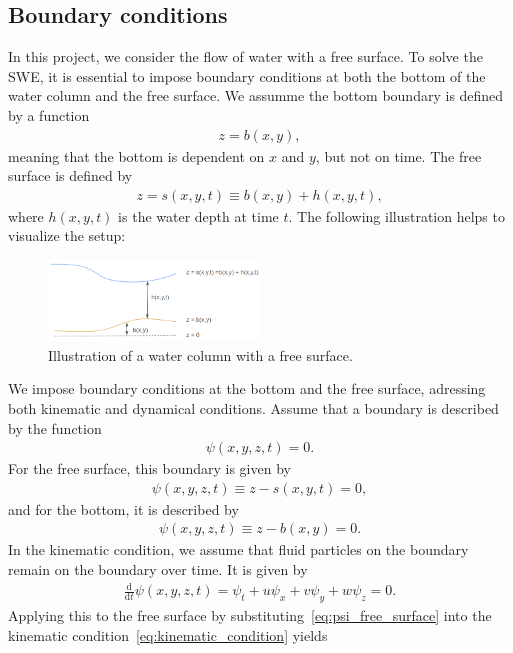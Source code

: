 \subsection{Boundary conditions}
In this project, we consider the flow of water with a free surface.
To solve the SWE, it is essential to impose boundary conditions at both the bottom of the water column and the free surface.
We assumme the bottom boundary is defined by a function
\begin{align*}
    z = b(x,y),
\end{align*}
meaning that the bottom is dependent on $x$ and $y$, but not on time.
The free surface is defined by 
\begin{align*}
    z = s(x,y,t) \equiv b(x,y) + h(x,y,t),
\end{align*}
where $h(x,y,t)$ is the water depth at time $t$.
The following illustration helps to visualize the setup:
\begin{figure}[H]
    \centering
    \includegraphics[width=0.5\textwidth]{figs/water-column-bc.png}
    \caption{Illustration of a water column with a free surface.}\label{fig:water_column_bc}
\end{figure}
We impose boundary conditions at the bottom and the free surface, adressing both kinematic and dynamical conditions.
Assume that a boundary is described by the function 
\begin{align*}
    \psi(x,y,z,t) = 0.
\end{align*}
For the free surface, this boundary is given by
\begin{align}\label{eq:psi_free_surface}
    \psi(x,y,z,t) \equiv z - s(x,y,t) = 0,
\end{align}
and for the bottom, it is described by
\begin{align}\label{eq:psi_bottom}
    \psi(x,y,z,t) \equiv z - b(x,y) = 0.
\end{align}
In the kinematic condition, we assume that fluid particles on the boundary remain on the boundary over time.
It is given by
\begin{align}\label{eq:kinematic_condition}
    \frac{\text{d} }{\text{d} t} \psi(x,y,z,t) = \psi_t + u \psi_x + v \psi_y + w \psi_z = 0.
\end{align}
Applying this to the free surface by substituting~\eqref{eq:psi_free_surface} into the kinematic condition~\eqref{eq:kinematic_condition} yields
